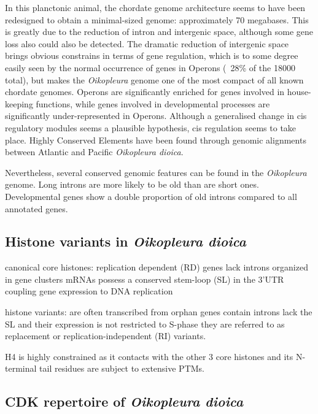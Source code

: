\documentclass[11pt,twoside,a4paper]{report}
\begin{document}
		In this planctonic animal, the chordate genome architecture seems to have been redesigned to obtain a minimal-sized genome: approximately 70 megabases. This is greatly due to the reduction of intron and intergenic space, although some gene loss also could also be detected. The dramatic reduction of intergenic space brings obvious constrains in terms of gene regulation, which is to some degree easily seen by the normal occurrence of genes in Operons (~28\% of the 18000 total), but makes the \textit{Oikopleura} genome one of the most compact of all known chordate genomes.
		Operons are significantly enriched for genes involved in house-keeping functions, while genes involved in developmental processes are significantly under-represented in Operons.
		Although a generalised change in cis regulatory modules seems a plausible hypothesis, cis regulation seems to take place. Highly Conserved Elements have been found through genomic alignments between Atlantic and Pacific \textit{Oikopleura dioica}.
		
		Nevertheless, several conserved genomic features can be found in the \textit{Oikopleura} genome.
		Long introns are more likely to be old than are short ones.
		Developmental genes show a double proportion of old introns compared to all annotated genes.
		
		
		\subsection{Histone variants in \textit{Oikopleura dioica}}
		\cite{Moosmann2011}

canonical core histones:
	replication dependent (RD) genes
	lack introns
	organized in gene clusters
	mRNAs possess a conserved stem-loop (SL) in the 3’UTR coupling gene expression to DNA replication

histone variants:
	are often transcribed from orphan genes
	contain introns
	lack the SL and their expression is not restricted to S-phase
	they are referred to as replacement or replication-independent (RI) variants.

H4 is highly constrained as it contacts with the other 3 core histones and its N-terminal tail residues are subject to extensive PTMs.
			
		\subsection{CDK repertoire of \textit{Oikopleura dioica}}
		
\end{document}

